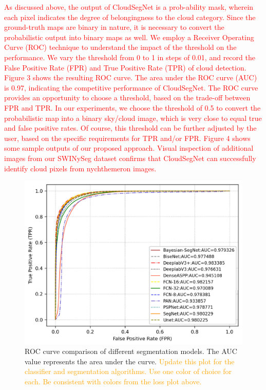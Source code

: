 \documentclass[amt, article]{copernicus}
\begin{document}
\textcolor{red}{As discussed above, the output of CloudSegNet is a prob-ability mask, wherein each pixel indicates the degree of belongingness to the cloud category. Since the ground-truth maps are binary in nature, it is necessary to convert the probabilistic output into binary maps as well. We employ a Receiver Operating Curve (ROC) technique to understand the impact of the threshold on the performance. We vary the threshold from 0 to 1 in steps of 0.01, and record the False Positive Rate (FPR) and True Positive Rate (TPR) of cloud detection. Figure 3 shows the resulting ROC curve. The area under the ROC curve (AUC) is 0.97, indicating the competitive performance of CloudSegNet. The ROC curve provides an opportunity to choose a threshold, based on the trade-off between FPR and TPR. In our experiments, we choose the threshold of 0.5 to convert the probabilistic map into a binary sky/cloud image, which is very close to equal true and false positive rates. Of course, this threshold can be further adjusted by the user, based on the specific requirements for TPR and/or FPR. Figure 4 shows some sample outputs of our proposed approach. Visual inspection of additional images from our SWINySeg dataset confirms that CloudSegNet can successfully identify cloud pixels from nychthemeron images.}


\begin{figure}[t]
	\includegraphics[width=\hsize]{figures/roc_curve.png}
	\caption{ROC curve comparison of different segmentation models. The AUC value represents the area under the curve. \textcolor{orange}{Update this plot for the classifier and segmentation algorithms. Use one color of choice for each. Be consistent with colors from the loss plot above.}}
    \label{fig:roc_curve}
\end{figure}
\end{document}
